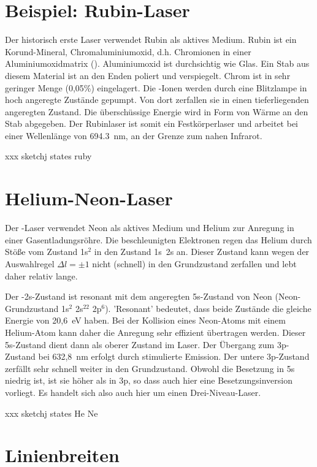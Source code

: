 \section{Beispiel: Rubin-Laser}

Der historisch erste Laser verwendet Rubin als aktives Medium. Rubin ist ein Korund-Mineral, Chromaluminiumoxid, d.h. Chromionen in einer Aluminiumoxidmatrix (). Aluminiumoxid ist durchsichtig wie Glas. Ein Stab aus diesem Material ist an den Enden poliert und verspiegelt. Chrom ist in sehr geringer Menge (0,05\%) eingelagert. Die -Ionen werden durch eine Blitzlampe in hoch angeregte Zustände gepumpt. Von dort zerfallen sie in einen tieferliegenden angeregten Zustand. Die überschüssige Energie wird in Form von Wärme an den Stab abgegeben. Der Rubinlaser ist somit ein Festkörperlaser und arbeitet bei einer Wellenlänge von 694.3~nm, an der Grenze zum nahen Infrarot. 

xxx sketchj states ruby

\section{Helium-Neon-Laser}

Der -Laser verwendet Neon als aktives Medium und Helium zur Anregung in einer Gasentladungsröhre. Die beschleunigten Elektronen regen das Helium durch Stöße vom Zustand 1s$^2$ in den Zustand 1s~2s an. Dieser Zustand kann wegen der Auswahlregel $\Delta l = \pm1$ nicht (schnell) in den Grundzustand zerfallen und lebt daher relativ lange. 

Der -2s-Zustand ist resonant mit dem angeregten 5s-Zustand von Neon (Neon-Grundzustand 1s$^2$ 2s$^22$ 2p$^6$). 'Resonant' bedeutet, dass beide Zustände die gleiche Energie von 20,6~eV haben.  Bei der Kollision eines Neon-Atoms mit einem Helium-Atom kann daher die Anregung sehr effizient übertragen werden. Dieser 5s-Zustand dient dann als oberer Zustand im Laser. Der Übergang zum 3p-Zustand bei 632,8~nm erfolgt durch stimulierte Emission. Der untere 3p-Zustand zerfällt sehr schnell weiter in den Grundzustand. Obwohl die Besetzung in 5s niedrig ist, ist sie höher als in 3p, so dass auch hier eine Besetzungsinversion vorliegt. Es handelt sich also auch hier um einen Drei-Niveau-Laser.

xxx sketchj states He Ne


\section{Linienbreiten}

